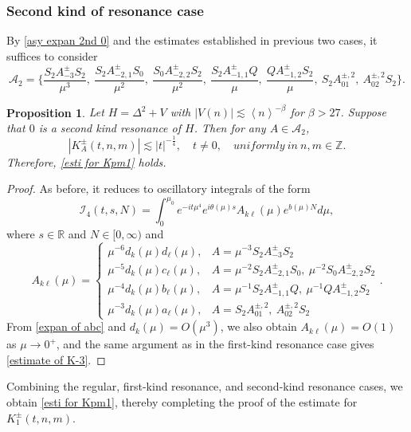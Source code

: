 \documentclass[reqno, 11pt]{amsart}
\newtheorem{proposition}[definition]{Proposition}
\newcommand\R{\mathbb{R}}
\newcommand\Z{\mathbb{Z}}
\newcommand\mcaI{\mathcal{I}}
\newcommand\mcaA{\mathcal{A}}
\numberwithin{equation}{section}
\begin{document}
\subsubsection{{\bf {Second kind of resonance case}}}
By \eqref{asy expan 2nd 0} and the estimates established in previous two cases, it suffices to consider
$$\mcaA_2=\Big\{\frac{S_{2}A^{\pm}_{-3}S_{2}}{\mu^3},\ \frac{S_2A^{\pm}_{-2,1}S_0}{\mu^2},\ \frac{S_0A^{\pm}_{-2,2}S_2}{\mu^2},\ \frac{ S_2A^{\pm}_{-1,1}Q}{\mu},\ \frac{ QA^{\pm}_{-1,2}S_2}{\mu},\ S_2A^{\pm,2}_{01},\ A^{\pm,2}_{02}S_2\Big\}.$$ 
\begin{proposition}\label{propo of K-3}
 Let $H=\Delta^2+V$ with $|V(n)|\lesssim \left<n\right>^{-\beta}$ for $\beta>27$. Suppose that $0$ is a second kind resonance of $H$. Then for any $A\in\mcaA_2$, 
\begin{equation}\label{estimate of K-3}
|K^{\pm}_A(t,n,m)|\lesssim |t|^{-\frac{1}{4}},\quad t\neq0,\quad uniformly\  in\  n,m\in\Z.
\end{equation}
Therefore, \eqref{esti for Kpm1} holds.
\end{proposition}
\begin{proof} As before, it  reduces to oscillatory integrals of the form
\begin{equation*}
\mcaI_{4}(t,s,N)=\int_{0}^{\mu_0}e^{-it\mu^4}e^{i\theta(\mu)s}A_{k\ell}(\mu)e^{b(\mu)N}d\mu,
\end{equation*}
where $s\in\R$ and $N\in[0,\infty)$ and
\begin{equation*}
    A_{k\ell}(\mu)=\begin{cases}
    \mu^{-6}d_k(\mu)d_{\ell}(\mu),&A=\mu^{-3}S_{2}A^{\pm}_{-3}S_{2} \\
    \mu^{-5}d_k(\mu)c_{\ell}(\mu),&A=\mu^{-2}S_2A^{\pm}_{-2,1}S_0,\ \mu^{-2}S_0A^{\pm}_{-2,2}S_2 \\
    \mu^{-4}d_k(\mu)b_{\ell}(\mu), &A=\mu^{-1} S_2A^{\pm}_{-1,1}Q,\ \mu^{-1}QA^{\pm}_{-1,2}S_2\\
    \mu^{-3}d_k(\mu)a_{\ell}(\mu),&A=S_2A^{\pm,2}_{01},\ A^{\pm,2}_{02}S_2
    \end{cases}.
\end{equation*}
From \eqref{expan of abc} and $d_k(\mu)=O(\mu^3)$, we also obtain $A_{k\ell}(\mu)=O(1)$ as $\mu\rightarrow0^+$, and the same argument as in the first-kind resonance case gives \eqref{estimate of K-3}.
\end{proof}
Combining the regular, first-kind resonance, and second-kind resonance cases, we obtain \eqref{esti for Kpm1}, thereby completing the proof of the estimate for $K^{\pm}_1(t,n,m)$.
\end{document}
